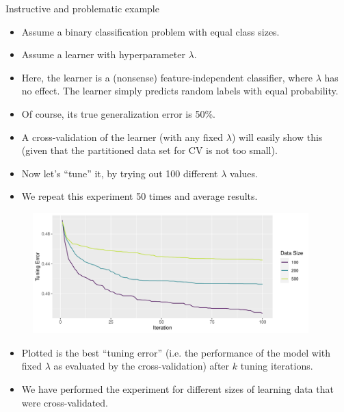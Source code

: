 \documentclass[11pt,compress,t,notes=noshow, xcolor=table]{beamer}
\begin{document}
\begin{vbframe}{Instructive and problematic example}
\begin{itemize}
    \item Assume a binary classification problem with equal class sizes.
    \item Assume a learner with hyperparameter $\lambda$.
    \item Here, the learner is a (nonsense) feature-independent classifier,
          where $\lambda$ has no effect. The learner simply
          predicts random labels with equal probability.
    \item Of course, its true generalization error is 50\%.
    \item A cross-validation of the learner (with any fixed $\lambda$) will easily show this
      (given that the partitioned data set for CV is not too small).
    \item Now let's \enquote{tune} it, by trying out 100 different $\lambda$ values.
    \item We repeat this experiment 50 times and average results.
\end{itemize}

\framebreak

\begin{figure}
\centering 
\includegraphics[width=0.95\textwidth]{figure/cart_tuning_nestintro_1} 
\end{figure}



\begin{itemize}
\item Plotted is the best \enquote{tuning error} (i.e. the performance of the model with fixed $\lambda$ as evaluated by the cross-validation) after $k$ tuning iterations.
\item We have performed the experiment for different sizes of learning data
      that were cross-validated.
\end{itemize}


\end{vbframe}
\end{document}
